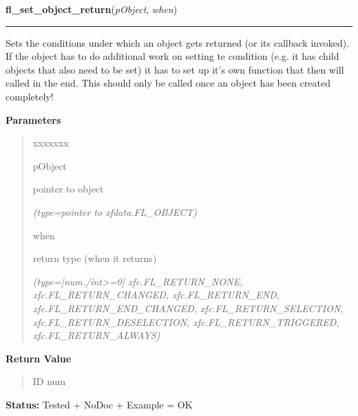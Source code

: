 \hspace{.8\funcindent}\begin{boxedminipage}{\funcwidth}

    \raggedright \textbf{fl\_set\_object\_return}(\textit{pObject}, \textit{when})

    \vspace{-1.5ex}

    \rule{\textwidth}{0.5\fboxrule}
\setlength{\parskip}{2ex}
    Sets the conditions under which an object gets returned (or its 
    callback invoked). If the object has to do additional work on setting 
    te condition (e.g. it has child objects that also need to be set) it 
    has to set up it's own function that then will called in the end. This 
    should only be called once an object has been created completely!

\setlength{\parskip}{1ex}
      \textbf{Parameters}
      \vspace{-1ex}

      \begin{quote}
        \begin{Ventry}{xxxxxxx}

          \item[pObject]

          pointer to object

            {\it (type=pointer to xfdata.FL\_OBJECT)}

          \item[when]

          return type (when it returns)

            {\it (type=[num./int{\textgreater}=0] xfc.FL\_RETURN\_NONE, xfc.FL\_RETURN\_CHANGED, 
xfc.FL\_RETURN\_END, xfc.FL\_RETURN\_END\_CHANGED, 
xfc.FL\_RETURN\_SELECTION, xfc.FL\_RETURN\_DESELECTION, 
xfc.FL\_RETURN\_TRIGGERED, xfc.FL\_RETURN\_ALWAYS)}

        \end{Ventry}

      \end{quote}

      \textbf{Return Value}
    \vspace{-1ex}

      \begin{quote}
      ID num

      \end{quote}

\textbf{Status:} Tested + NoDoc + Example = OK



    \end{boxedminipage}

